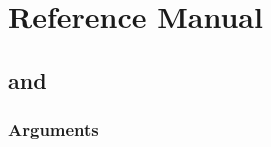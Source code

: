 \documentclass[]{jss}
\begin{document}
\hypertarget{reference-manual}{%
\section{Reference Manual}\label{reference-manual}}

\subsection[lmtp_tmle and lmtp_sdr]{ and }

\subsubsection{Arguments}

\begin{itemize}


\end{itemize}
\end{document}
